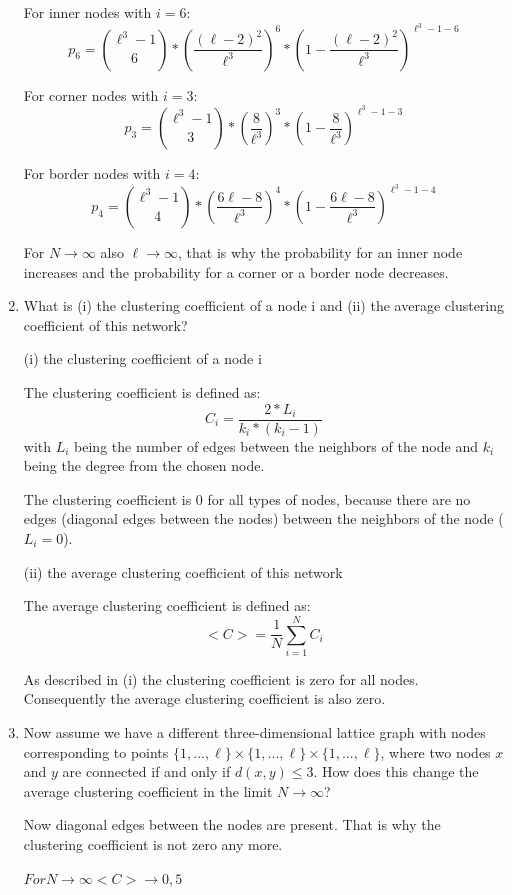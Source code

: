 \begin{enumerate}
	For inner nodes with $i=6$:
	\begin{equation}
	p_6 = {{\ell^3-1}\choose{6}} * (\frac{(\ell-2)^2}{\ell^3})^6 * (1-{\frac{(\ell-2)^2}{\ell^3}})^{\ell^3-1-6}
	\end{equation}
	
	For corner nodes with $i=3$:
	\begin{equation}
	p_3 = {{\ell^3-1}\choose{3}} * ({\frac{8}{\ell^3}})^3 * (1-{\frac{8}{\ell^3}})^{\ell^3-1-3}
	\end{equation}
	
	For border nodes with $i=4$:
	\begin{equation}
	p_4 = {{\ell^3-1}\choose{4}} * ({\frac{6\ell-8}{\ell^3}})^4 * (1-{\frac{6\ell-8}{\ell^3}})^{\ell^3-1-4}
	\end{equation}
	
	For $N \rightarrow \infty$ also $\ell \rightarrow \infty$, that is why the probability for an inner node increases and the probability for a corner or a border node decreases.
	
	\item What is (i) the clustering coefficient of a node i and (ii) the average clustering coefficient of this network?
	\vspace{0.25cm}
	
	(i) the clustering coefficient of a node i
	
	The clustering coefficient is defined as:
	\begin{equation}
	C_i = \frac{2*L_i}{k_i * (k_i-1)}
	\end{equation}
	with $L_i$ being the number of edges between the neighbors of the node and $k_i$ being the degree from the chosen node.
	
	The clustering coefficient is 0 for all types of nodes, because there are no edges (diagonal edges between the nodes) between the neighbors of the node ($L_i = 0$).
	
	(ii) the average clustering coefficient of this network
	
	The average clustering coefficient is defined as:
	\begin{equation}
	<C> = \frac{1}{N} \sum_{i=1}^{N} C_i
	\end{equation}
	
	As described in (i) the clustering coefficient is zero for all nodes. Con\-se\-quent\-ly the average clustering coefficient is also zero.
	
	\item Now assume we have a different three-dimensional lattice graph with nodes corresponding to points $\{1,...,\ell\}\times\{1,...,\ell\}\times\{1,...,\ell\}$, where two nodes $x$ and $y$ are connected if and only if $d(x,y) \leq 3$. How	does this change the average clustering coefficient in the limit $N \rightarrow \infty$?
	\vspace{0.25cm}
	
	Now diagonal edges between the nodes are present. That is why the clustering coefficient is not zero any more.
	
	$ For N \rightarrow \infty <C> \rightarrow 0,5 $
	
\end{enumerate}